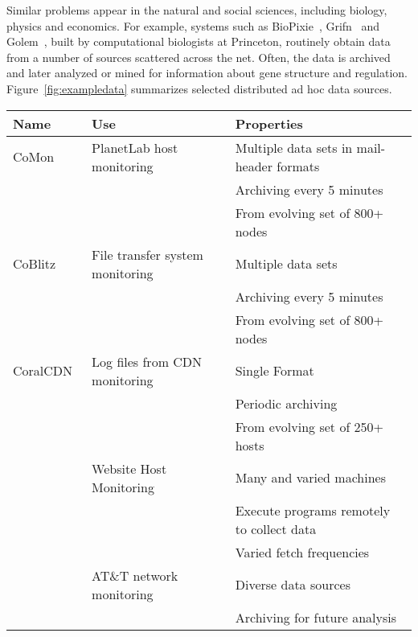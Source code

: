 Similar problems appear in the natural and social sciences,
including biology, physics and economics.  For example, systems such
as BioPixie~\cite{biopixie}, Grifn~\cite{grifn} and
Golem~\cite{golem}, built by computational biologists at Princeton,
routinely obtain data from a number of sources scattered
across the net.  Often, the data is archived and later analyzed or
mined for information about gene structure and regulation.
Figure~\ref{fig:exampledata} summarizes 
selected distributed ad hoc data sources.


\begin{figure*}
\begin{center}
\begin{tabular}{|l|l|l|}
\hline\hline
Name & Use & Properties 
\\\hline\hline
CoMon~\cite{comon} & PlanetLab host monitoring & Multiple data sets in mail-header formats\\
                                       && Archiving every 5 minutes \\
                                       && From evolving set of 800+ nodes \\\hline
CoBlitz~\cite{coblitz} & File transfer system monitoring & Multiple data sets \\
                                       && Archiving every 5 minutes \\
                                       && From evolving set of 800+ nodes \\\hline
CoralCDN~\cite{coral} & Log files from CDN monitoring & Single Format \\
                                       && Periodic archiving \\
                                       && From evolving set of 250+ hosts \\\hline
\vizGems{}       & Website Host Monitoring & Many and varied machines \\
                 &                         & Execute programs remotely to collect data\\
                 &                         & Varied fetch frequencies \\\hline
\darkstar{}      & AT\&T network monitoring & Diverse data sources\\
                                           && Archiving for future analysis \\

\end{tabular}
\end{center}
\end{figure*}
